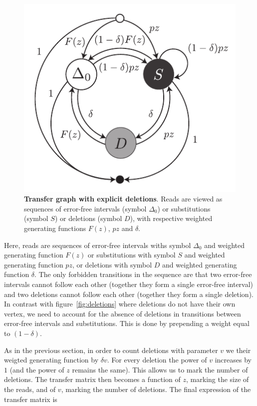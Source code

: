\documentclass{article}
\begin{document}
\begin{figure}[h]
\centering
\includegraphics[scale=0.9]{deletions2.pdf}
\caption{\textbf{Transfer graph with explicit deletions}. 
Reads are viewed as sequences of error-free intervals (symbol $\Delta_0$)
or substitutions (symbol $S$) or deletions (symbol $D$), with respective
weighted generating functions $F(z)$, $pz$ and $\delta$.}
\label{fig:deletions2}
\end{figure}

Here, reads are sequences of error-free intervals withs symbol $\Delta_0$
and weighted generating function $F(z)$ or substitutions with symbol $S$
and weighted generating function $pz$, or deletions with symbol $D$ and
weighted generating function $\delta$. The only forbidden transitions in
the sequence are that two error-free intervals cannot follow each other
(together they form a single error-free interval) and two deletions cannot
follow each other (together they form a single deletion). In contrast with
figure~\ref{fig:deletions} where deletions do not have their own vertex,
we need to account for the absence of deletions in transitions between
error-free intervals and substitutions. This is done by prepending a
weight equal to $(1-\delta)$.

As in the previous section, in order to count deletions with parameter $v$
we their weigted generating function by $\delta v$. For every deletion the
power of $v$ increases by $1$ (and the power of $z$ remains the same).
This allows us to mark the number of deletions. The transfer matrix then
becomes a function of $z$, marking the size of the reads, and of $v$,
marking the number of deletions. The final expression of the transfer
matrix is
\end{document}
